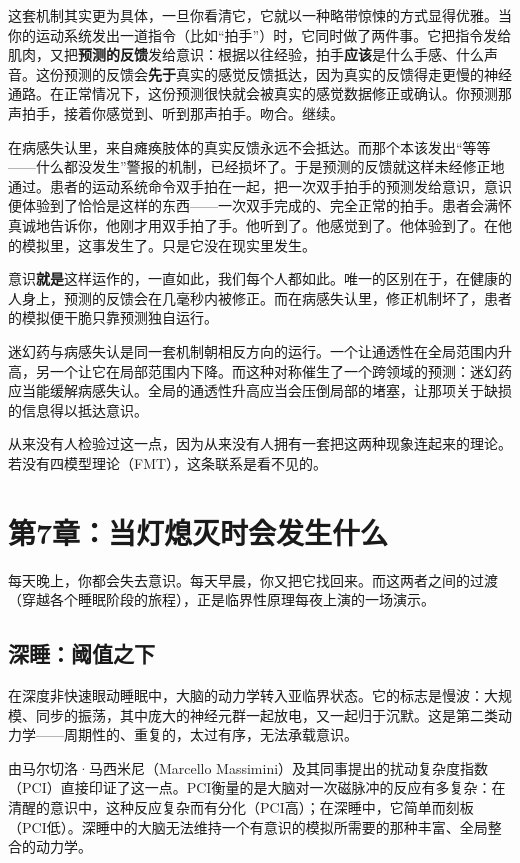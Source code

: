 \documentclass[11pt, twoside, openright]{book}
\begin{document}
这套机制其实更为具体，一旦你看清它，它就以一种略带惊悚的方式显得优雅。当你的运动系统发出一道指令（比如“拍手”）时，它同时做了两件事。它把指令发给肌肉，又把\textbf{预测的反馈}发给意识：根据以往经验，拍手\textbf{应该}是什么手感、什么声音。这份预测的反馈会\textbf{先于}真实的感觉反馈抵达，因为真实的反馈得走更慢的神经通路。在正常情况下，这份预测很快就会被真实的感觉数据修正或确认。你预测那声拍手，接着你感觉到、听到那声拍手。吻合。继续。

在病感失认里，来自瘫痪肢体的真实反馈永远不会抵达。而那个本该发出“等等------什么都没发生”警报的机制，已经损坏了。于是预测的反馈就这样未经修正地通过。患者的运动系统命令双手拍在一起，把一次双手拍手的预测发给意识，意识便体验到了恰恰是这样的东西------一次双手完成的、完全正常的拍手。患者会满怀真诚地告诉你，他刚才用双手拍了手。他听到了。他感觉到了。他体验到了。在他的模拟里，这事发生了。只是它没在现实里发生。

意识\textbf{就是}这样运作的，一直如此，我们每个人都如此。唯一的区别在于，在健康的人身上，预测的反馈会在几毫秒内被修正。而在病感失认里，修正机制坏了，患者的模拟便干脆只靠预测独自运行。

迷幻药与病感失认是同一套机制朝相反方向的运行。一个让通透性在全局范围内升高，另一个让它在局部范围内下降。而这种对称催生了一个跨领域的预测：迷幻药应当能缓解病感失认。全局的通透性升高应当会压倒局部的堵塞，让那项关于缺损的信息得以抵达意识。

从来没有人检验过这一点，因为从来没有人拥有一套把这两种现象连起来的理论。若没有四模型理论（FMT），这条联系是看不见的。


\chapter*{第7章：当灯熄灭时会发生什么}

每天晚上，你都会失去意识。每天早晨，你又把它找回来。而这两者之间的过渡（穿越各个睡眠阶段的旅程），正是临界性原理每夜上演的一场演示。

\section*{深睡：阈值之下}

在深度非快速眼动睡眠中，大脑的动力学转入亚临界状态。它的标志是慢波：大规模、同步的振荡，其中庞大的神经元群一起放电，又一起归于沉默。这是第二类动力学------周期性的、重复的，太过有序，无法承载意识。

由马尔切洛·马西米尼（Marcello Massimini）及其同事提出的扰动复杂度指数（PCI）直接印证了这一点。PCI衡量的是大脑对一次磁脉冲的反应有多复杂：在清醒的意识中，这种反应复杂而有分化（PCI高）；在深睡中，它简单而刻板（PCI低）。深睡中的大脑无法维持一个有意识的模拟所需要的那种丰富、全局整合的动力学。
\end{document}

